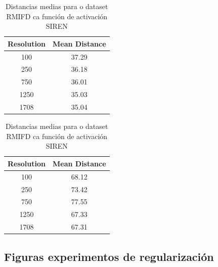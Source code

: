 \begin{table}[h]
    \centering
    \begin{minipage}[t]{0.45\linewidth}
        \centering
        \scriptsize
        \setlength{\tabcolsep}{25pt}
        \begin{tabular}{|c|c|}
        \hline
        Resolution & Mean Distance \\ \hline
        100 & 37.29 \\ \hline
        250 & 36.18 \\ \hline
        750 & 36.01 \\ \hline
        1250 & 35.03 \\ \hline
        1708 & 35.04 \\ \hline
        \end{tabular}
        \caption{Distancias medias para o dataset RFMID ca función de activación Relu}
        \label{tab:mlp_mean_distances_rfmid}
    \end{minipage}
    \hfill
    \begin{minipage}[t]{0.45\linewidth}
        \centering
        \scriptsize
        \setlength{\tabcolsep}{25pt}
        \begin{tabular}{|c|c|}
        \hline
        Resolution & Mean Distance \\ \hline
        100 & 68.12 \\ \hline
        250 & 73.42 \\ \hline
        750 & 77.55 \\ \hline
        1250 & 67.33 \\ \hline
        1708 & 67.31 \\ \hline
        \end{tabular}
        \caption{Distancias medias para o dataset RMIFD ca función de activación SIREN}
        \label{tab:siren_mean_distances_rfmid}
    \end{minipage}
\end{table}


\subsection{Figuras experimentos de regularización}
\label{subsec:figuras_experimentos_regularizacion}

